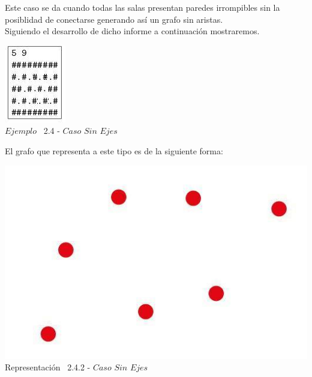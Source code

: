 Este caso se da cuando todas las salas presentan paredes irrompibles sin la posiblidad de conectarse generando as\'i un grafo sin aristas.\\

Siguiendo el desarrollo de dicho informe a continuaci\'on mostraremos.\\
 
\vspace*{0.3cm} \vspace*{0.3cm}
  \begin{center}
 \includegraphics[scale=1.6]{./EJ2/ej2sinejes.jpeg}
\\ {$Ejemplo$ \ 2.4 - $Caso$ $Sin$ $Ejes$}
  \end{center}
  \vspace*{0.3cm}

El grafo que representa a este tipo es de la siguiente forma:\\

\vspace*{0.3cm} \vspace*{0.3cm}
  \begin{center}
 \includegraphics[scale=0.5]{./EJ2/grafoSinEjes.jpeg}
 \\{Representación \ 2.4.2 - $Caso$ $Sin$ $Ejes$}
  \end{center}
  \vspace*{0.3cm}

